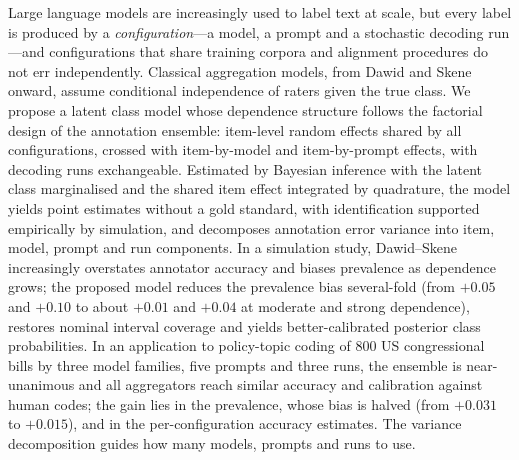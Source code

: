 Large language models are increasingly used to label text at scale, but every label is produced by a \emph{configuration}---a model, a prompt and a stochastic decoding run---and configurations that share training corpora and alignment procedures do not err independently. Classical aggregation models, from Dawid and Skene onward, assume conditional independence of raters given the true class. We propose a latent class model whose dependence structure follows the factorial design of the annotation ensemble: item-level random effects shared by all configurations, crossed with item-by-model and item-by-prompt effects, with decoding runs exchangeable. Estimated by Bayesian inference with the latent class marginalised and the shared item effect integrated by quadrature, the model yields point estimates without a gold standard, with identification supported empirically by simulation, and decomposes annotation error variance into item, model, prompt and run components. In a simulation study, Dawid--Skene increasingly overstates annotator accuracy and biases prevalence as dependence grows; the proposed model reduces the prevalence bias several-fold (from $+0.05$ and $+0.10$ to about $+0.01$ and $+0.04$ at moderate and strong dependence), restores nominal interval coverage and yields better-calibrated posterior class probabilities. In an application to policy-topic coding of 800 US congressional bills by three model families, five prompts and three runs, the ensemble is near-unanimous and all aggregators reach similar accuracy and calibration against human codes; the gain lies in the prevalence, whose bias is halved (from $+0.031$ to $+0.015$), and in the per-configuration accuracy estimates. The variance decomposition guides how many models, prompts and runs to use.
